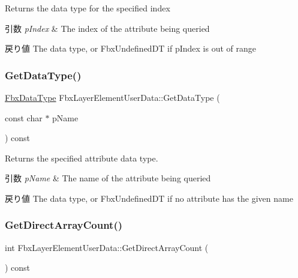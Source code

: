 Returns the data type for the specified index 
\begin{DoxyParams}{引数}
{\em p\+Index} & The index of the attribute being queried \\
\hline
\end{DoxyParams}
\begin{DoxyReturn}{戻り値}
The data type, or Fbx\+Undefined\+DT if p\+Index is out of range 
\end{DoxyReturn}
\mbox{\label{class_fbx_layer_element_user_data_ac1d9a921886ec4840fa7472f7fd72b28}} 
\subsubsection{\texorpdfstring{Get\+Data\+Type()}{GetDataType()}\hspace{0.1cm}{\footnotesize\ttfamily [2/2]}}
{\footnotesize\ttfamily \hyperlink{class_fbx_data_type}{Fbx\+Data\+Type} Fbx\+Layer\+Element\+User\+Data\+::\+Get\+Data\+Type (\begin{DoxyParamCaption}\item[{const char $\ast$}]{p\+Name }\end{DoxyParamCaption}) const}

Returns the specified attribute data type. 
\begin{DoxyParams}{引数}
{\em p\+Name} & The name of the attribute being queried \\
\hline
\end{DoxyParams}
\begin{DoxyReturn}{戻り値}
The data type, or Fbx\+Undefined\+DT if no attribute has the given name 
\end{DoxyReturn}
\mbox{\label{class_fbx_layer_element_user_data_a5f7f18cd0b66e1868f9307129f45f51d}} 
\subsubsection{\texorpdfstring{Get\+Direct\+Array\+Count()}{GetDirectArrayCount()}}
{\footnotesize\ttfamily int Fbx\+Layer\+Element\+User\+Data\+::\+Get\+Direct\+Array\+Count (\begin{DoxyParamCaption}{ }\end{DoxyParamCaption}) const}

